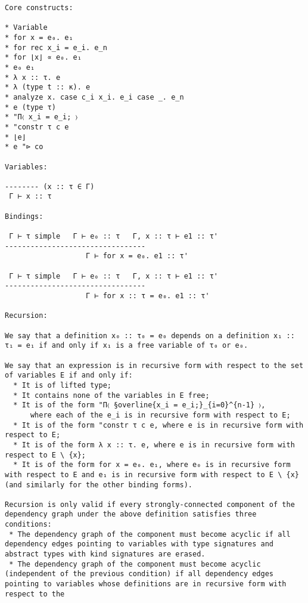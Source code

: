 \documentclass{report}
\begin{document}
\begin{verbatim}
Core constructs:

* Variable
* for x = e₀. e₁
* for rec x_i = e_i. e_n
* for ⌊x⌋ ∝ e₀. e₁
* e₀ e₁
* λ x :: τ. e
* λ (type t :: κ). e
* analyze x. case c_i x_i. e_i case _. e_n
* e (type τ)
* "Π〈 x_i = e_i; 〉
* "constr τ c e
* ⌊e⌋
* e "⊳ co

Variables:

-------- (x :: τ ∈ Γ)
 Γ ⊢ x :: τ

Bindings:

 Γ ⊢ τ simple   Γ ⊢ e₀ :: τ   Γ, x :: τ ⊢ e1 :: τ'
---------------------------------
                   Γ ⊢ for x = e₀. e1 :: τ'

 Γ ⊢ τ simple   Γ ⊢ e₀ :: τ   Γ, x :: τ ⊢ e1 :: τ'
---------------------------------
                   Γ ⊢ for x :: τ = e₀. e1 :: τ'

Recursion:

We say that a definition x₀ :: τ₀ = e₀ depends on a definition x₁ :: τ₁ = e₁ if and only if x₁ is a free variable of τ₀ or e₀.

We say that an expression is in recursive form with respect to the set of variables E if and only if:
  * It is of lifted type;
  * It contains none of the variables in E free;
  * It is of the form "Π〈 §overline{x_i = e_i;}_{i=0}^{n-1} 〉,
      where each of the e_i is in recursive form with respect to E;
  * It is of the form "constr τ c e, where e is in recursive form with respect to E;
  * It is of the form λ x :: τ. e, where e is in recursive form with respect to E \ {x};
  * It is of the form for x = e₀. e₁, where e₀ is in recursive form with respect to E and e₁ is in recursive form with respect to E \ {x} (and similarly for the other binding forms).

Recursion is only valid if every strongly-connected component of the dependency graph under the above definition satisfies three conditions:
 * The dependency graph of the component must become acyclic if all dependency edges pointing to variables with type signatures and abstract types with kind signatures are erased.
 * The dependency graph of the component must become acyclic (independent of the previous condition) if all dependency edges pointing to variables whose definitions are in recursive form with respect to the 
\end{verbatim}
\end{document}
